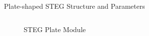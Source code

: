 \documentclass{beamer}
\begin{document}
\begin{frame}{Plate-shaped STEG Structure and Parameters}
    \begin{columns}
        \begin{column}{.35\textwidth}
            \vfill
            \begin{figure}
                \centering
                \caption{STEG Plate Module}
                \label{fig7}
            \end{figure}
        \end{column}
        

\end{columns}
\end{frame}
\end{document}
